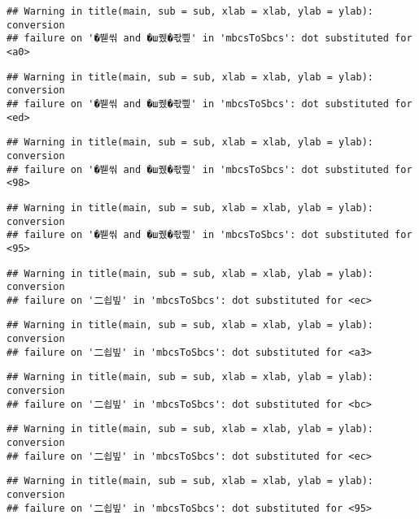 \documentclass[]{article}
\begin{document}
\begin{verbatim}
## Warning in title(main, sub = sub, xlab = xlab, ylab = ylab): conversion
## failure on '�붿씪 and �ш퀬�좏삎' in 'mbcsToSbcs': dot substituted for <a0>
\end{verbatim}

\begin{verbatim}
## Warning in title(main, sub = sub, xlab = xlab, ylab = ylab): conversion
## failure on '�붿씪 and �ш퀬�좏삎' in 'mbcsToSbcs': dot substituted for <ed>
\end{verbatim}

\begin{verbatim}
## Warning in title(main, sub = sub, xlab = xlab, ylab = ylab): conversion
## failure on '�붿씪 and �ш퀬�좏삎' in 'mbcsToSbcs': dot substituted for <98>
\end{verbatim}

\begin{verbatim}
## Warning in title(main, sub = sub, xlab = xlab, ylab = ylab): conversion
## failure on '�붿씪 and �ш퀬�좏삎' in 'mbcsToSbcs': dot substituted for <95>
\end{verbatim}

\begin{verbatim}
## Warning in title(main, sub = sub, xlab = xlab, ylab = ylab): conversion
## failure on '二쇱빞' in 'mbcsToSbcs': dot substituted for <ec>
\end{verbatim}

\begin{verbatim}
## Warning in title(main, sub = sub, xlab = xlab, ylab = ylab): conversion
## failure on '二쇱빞' in 'mbcsToSbcs': dot substituted for <a3>
\end{verbatim}

\begin{verbatim}
## Warning in title(main, sub = sub, xlab = xlab, ylab = ylab): conversion
## failure on '二쇱빞' in 'mbcsToSbcs': dot substituted for <bc>
\end{verbatim}

\begin{verbatim}
## Warning in title(main, sub = sub, xlab = xlab, ylab = ylab): conversion
## failure on '二쇱빞' in 'mbcsToSbcs': dot substituted for <ec>
\end{verbatim}

\begin{verbatim}
## Warning in title(main, sub = sub, xlab = xlab, ylab = ylab): conversion
## failure on '二쇱빞' in 'mbcsToSbcs': dot substituted for <95>
\end{verbatim}
\end{document}
